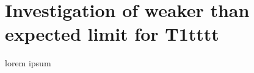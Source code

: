 \section{Investigation of weaker than expected limit for T1tttt \label{app:foundSusy}}

lorem ipsum
